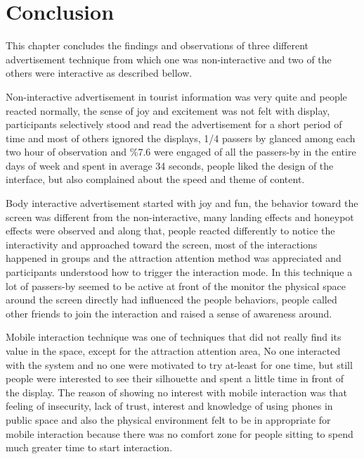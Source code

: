 


\newpage
\section{Conclusion}

This chapter concludes the findings and observations of three different advertisement technique from which one was non-interactive and two of the others were interactive as described bellow.

Non-interactive advertisement in tourist information was very quite and people reacted normally, the sense of joy and excitement was not felt with display, participants selectively stood and read the advertisement for a short period of time and most of others ignored the displays, 1/4 passers by glanced among each two hour of observation and \%7.6 were engaged of all the passers-by in the entire days of week and spent in average 34 seconds, people liked the design of the interface, but also complained about the speed and theme of content.

Body interactive advertisement started with joy and fun, the behavior toward the screen was different from the non-interactive, many landing effects and honeypot effects were observed and along that, people reacted differently to notice the interactivity and approached toward the screen, most of the interactions happened in groups and the attraction attention method was appreciated and participants understood how to trigger the interaction mode. In this technique a lot of passers-by seemed to be active at front of the monitor the physical space around the screen directly had influenced the people behaviors, people called other friends to join the interaction and raised a sense of awareness around. 

Mobile interaction technique was one of techniques that did not really find its value in the space, except for the attraction attention area, No one interacted with the system and no one were motivated to try at-least for one time, but still people were interested to see their silhouette and spent a little time in front of the display. The reason of showing no interest with mobile interaction was that feeling of insecurity, lack of trust, interest and knowledge of using phones in public space and also the physical environment felt to be in appropriate for mobile interaction because there was no comfort zone for people sitting to spend much greater time to start interaction.

